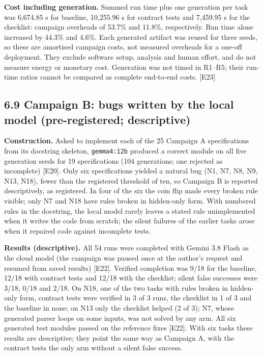 \documentclass[11pt]{article}
\newcommand{\code}[1]{\texttt{#1}}
\begin{document}
\textbf{Cost including generation.} Summed run time plus one generation per task was 6,674.85 s for baseline, 10,255.96 s for contract tests and 7,459.95 s for the checklist: campaign overheads of 53.7\% and 11.8\%, respectively. Run time alone increased by 44.3\% and 4.6\%. Each generated artifact was reused for three seeds, so these are amortised campaign costs, not measured overheads for a one-off deployment. They exclude software setup, analysis and human effort, and do not measure energy or monetary cost. Generation was not timed in R1–R5; their run-time ratios cannot be compared as complete end-to-end costs. [E23]

\subsection*{6.9 Campaign B: bugs written by the local model (pre-registered; descriptive)}
\textbf{Construction.} Asked to implement each of the 25 Campaign A specifications from its docstring skeleton, \code{gemma4:12b} produced a correct module on all five generation seeds for 19 specifications (104 generations; one rejected as incomplete) [E20]. Only six specifications yielded a natural bug (N1, N7, N8, N9, N13, N18), fewer than the registered threshold of ten, so Campaign B is reported descriptively, as registered. In four of the six the coin flip made every broken rule visible; only N7 and N18 have rules broken in hidden-only form. With numbered rules in the docstring, the local model rarely leaves a stated rule unimplemented when it writes the code from scratch; the silent failures of the earlier tasks arose when it repaired code against incomplete tests.

\textbf{Results (descriptive).} All 54 runs were completed with Gemini 3.8 Flash as the cloud model (the campaign was paused once at the author's request and resumed from saved results) [E22]. Verified completion was 9/18 for the baseline, 12/18 with contract tests and 12/18 with the checklist; silent false successes were 3/18, 0/18 and 2/18. On N18, one of the two tasks with rules broken in hidden-only form, contract tests were verified in 3 of 3 runs, the checklist in 1 of 3 and the baseline in none; on N13 only the checklist helped (2 of 3); N7, whose generated parser loops on some inputs, was not solved by any arm. All six generated test modules passed on the reference fixes [E22]. With six tasks these results are descriptive; they point the same way as Campaign A, with the contract tests the only arm without a silent false success.
\end{document}
